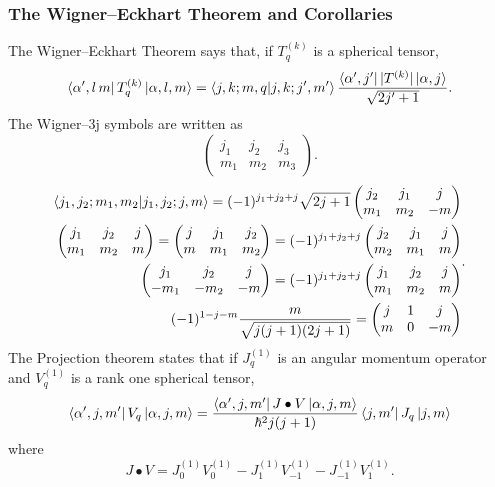 \documentclass{article}
\begin{document}
    \subsubsection*{The Wigner--Eckhart Theorem and Corollaries}
			The Wigner--Eckhart Theorem says that, if $T_q^{(k)}$ is a spherical tensor,
      \[
				\bra{\alpha',l\,m}T_q^{(k)}\ket{\alpha ,l,m} =
				\bra{j,k;m,q}\ket{j,k;j',m'}
				\frac{\bra{\alpha',j'}|T^{(k)}|\ket{\alpha,j}}{\sqrt{2 j' + 1}}
      .\] 
      The Wigner--3j symbols are written as 
      \[
      \begin{pmatrix}
        j_1 & j_2 & j_3 \\
        m_1 & m_2 & m_3
      \end{pmatrix}
      .\] 
      \[
        \begin{split}
          \bra{j_1,j_2;m_1,m_2}\ket{j_1,j_2;j,m} = (-1)^{j_1+j_2+j} \sqrt{2j+1}
          \begin{pmatrix}
            j_2 & j_1 & j \\
            m_1 & m_2 & -m
          \end{pmatrix} \\
          \begin{pmatrix}
            j_1 & j_2 & j \\
            m_1 & m_2 & m 
          \end{pmatrix} = 
          \begin{pmatrix}
            j & j_1 & j_2 \\
            m & m_1 & m_2 
          \end{pmatrix} = (-1)^{j_1 + j_2 + j} 
          \begin{pmatrix}
            j_2 & j_1 &j \\
            m_2 & m_1 & m
          \end{pmatrix} \\
          \begin{pmatrix}
            j_1 & j_2 & j \\
            -m_1 & -m_2 & -m 
          \end{pmatrix} = (-1)^{j_1 + j_2 + j}
          \begin{pmatrix}
            j_1 & j_2 & j \\
            m_1 & m_2 & m
          \end{pmatrix} \\
          (-1)^{1 - j - m}\frac{m}{\sqrt{j(j+1)(2j+1)}} = 
          \begin{pmatrix}
            j & 1 & j \\
            m & 0 & -m
          \end{pmatrix}
        \end{split}
      .\] 
		The Projection theorem states that if $J_q^{(1)}$ is an angular momentum 
      operator and $V_q^{(1)}$ is a rank one spherical tensor, 
      \[
        \bra{\alpha',j,m'}V_q\ket{\alpha,j,m} = 
        \frac{\bra{\alpha',j,m'}J\bullet V\ket{\alpha,j,m}}{\hbar^2 j(j+1)}
        \bra{j,m'}J_q\ket{j,m}
      \] 
			where
			\[
				J \bullet V = J_0^{(1)}V_0^{(1)} - J_1^{(1)}V_{-1}^{(1)} -
				J_{-1}^{(1)}V_1^{(1)}.
			\]
      

\end{document}
